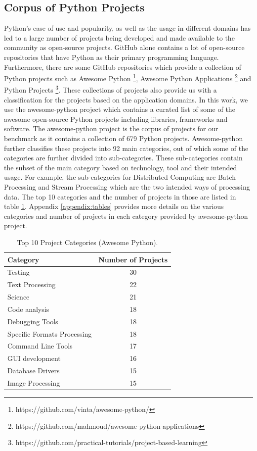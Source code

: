 \subsection{Corpus of Python Projects}
\label{approach:corpus of python projects}
Python's ease of use and popularity, as well as the usage in different domains has led to a large number of projects being developed and made available to the community as open-source projects.
GitHub alone contains a lot of open-source repositories that have Python as their primary programming language.
Furthermore, there are some GitHub repositories which provide a collection of Python projects such as Awesome Python \footnote{https://github.com/vinta/awesome-python/}, Awesome Python Applications \footnote{https://github.com/mahmoud/awesome-python-applications} and Python Projects \footnote{https://github.com/practical-tutorials/project-based-learning}.
These collections of projects also provide us with a classification for the projects based on the application domains.
In this work, we use the awesome-python project which contains a curated list of some of the awesome open-source Python projects including libraries, frameworks and software. 
The awesome-python project is the corpus of projects for our benchmark as it contains a collection of 679 Python projects.
Awesome-python further classifies these projects into 92 main categories, out of which some of the categories are further divided into sub-categories.
These sub-categories contain the subset of the main category based on technology, tool and their intended usage.
For example, the sub-categories for Distributed Computing are Batch Processing and Stream Processing which are the two intended ways of processing data.
The top 10 categories and the number of projects in those are listed in table \ref{table:awesome-python}.
Appendix \ref{appendix:tables} provides more details on the various categories and number of projects in each category provided by awesome-python project.

\begin{table}[ht]
    \centering
    \begin{tabular}{lc}
    \hline
    \textbf{Category} & \textbf{Number of Projects}\\
    \hline
    Testing & 30\\
    Text Processing & 22\\
    Science & 21\\
    Code analysis & 18\\
    Debugging Tools & 18\\
    Specific Formats Processing & 18\\
    Command Line Tools & 17\\
    GUI development & 16\\
    Database Drivers & 15\\
    Image Processing & 15\\
    \hline
    \end{tabular}
    \caption{Top 10 Project Categories (Awesome Python).}
    \label{table:awesome-python}
\end{table}

